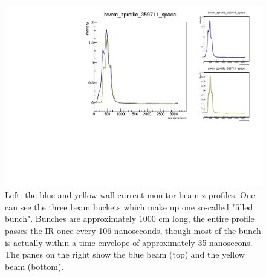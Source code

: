 \begin{figure}
\begin{center}
\includegraphics[width=\linewidth,height=\textheight,keepaspectratio]{./figures/359711_wcm_zprofile}
\caption{ 
Left: the blue and yellow wall current monitor beam z-profiles. One can see the
three beam buckets which make up one so-called "filled bunch". Bunches are
approximately 1000 cm long, the entire profile passes the IR once every 106
nanoseconds, though most of the bunch is actually within a time envelope of
approximately 35 nanosecons. The panes on the right show the blue beam (top)
and the yellow beam (bottom).
}
\label{fig:359711_wcm_zprofile}
\end{center}
\end{figure}

